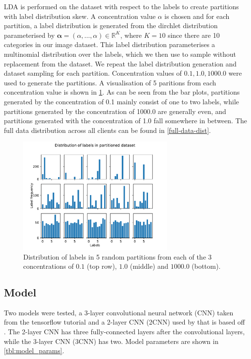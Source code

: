 \documentclass{article}
\begin{document}
LDA is performed on the dataset with respect to the labels to create partitions with label distribution skew. A concentration value $\alpha$ is chosen and for each partition, a label distribution is generated from the dirchlet distribution parameterised by $\bm{\alpha}=(\alpha,\ldots,\alpha)\in\mathbb{R}^K$, where $K=10$ since there are 10 categories in our image dataset. This label distribution parameterises a multinomial distribution over the labels, which we then use to sample without replacement from the dataset. We repeat the label distribution generation and dataset sampling for each partition. Concentration values of $0.1, 1.0, 1000.0$ were used to generate the partitions. A visualisation of 5 paritions from each concentration value is shown in \cref{fig:label_freq_partial}. As can be seen from the bar plots, partitions generated by the concentration of 0.1 mainly consist of one to two labels, while partitions generated by the concentration of 1000.0 are generally even, and partitions generated with the concentration of 1.0 fall somewhere in between. The full data distribution across all clients can be found in \cref{full-data-dist}.

\begin{figure}
  \centering
  \includegraphics[width=0.7\textwidth]{images/label_dist_partial}
  \caption{Distribution of labels in 5 random partitions from each of the 3 concentrations of $0.1$ (top row), $1.0$ (middle) and $1000.0$ (bottom).}
  \label{fig:label_freq_partial}
\end{figure}

\subsection{Model}
Two models were tested, a 3-layer convolutional neural network (CNN) taken from the tensorflow tutorial \cite{ConvolutionalNeuralNetwork2024} and a 2-layer CNN (2CNN) used by \citet{zhouUnderstandingImprovingModel2023} that is based off \cite{mcmahanCommunicationEfficientLearningDeep2017}. The 2-layer CNN has three fully-connected layers after the convolutional layers, while the 3-layer CNN (3CNN) has two. Model parameters are shown in \cref{tbl:model_params}.
\end{document}
